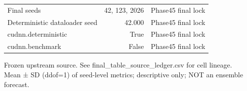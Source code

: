 \begin{table}[h!]
\begin{tabular}{lrr}
Final seeds & 42, 123, 2026 & Phase45 final lock \\
Deterministic dataloader seed & 42.000 & Phase45 final lock \\
cudnn.deterministic & True & Phase45 final lock \\
cudnn.benchmark & False & Phase45 final lock \\
\bottomrule
\end{tabular}
\vspace{4pt}
\footnotesize{Frozen upstream source. See final\_table\_source\_ledger.csv for cell lineage.}\\
\footnotesize{Mean ± SD (ddof=1) of seed-level metrics; descriptive only; NOT an ensemble forecast.}\\
\end{table}
